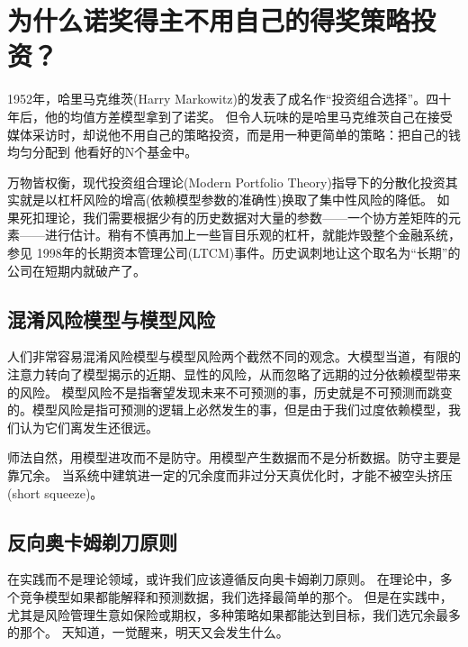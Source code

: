 \documentclass[
  oneside]{book}
\begin{document}
\hypertarget{ux4e3aux4ec0ux4e48ux8bfaux5956ux5f97ux4e3bux4e0dux7528ux81eaux5df1ux7684ux5f97ux5956ux7b56ux7565ux6295ux8d44}{%
\chapter{为什么诺奖得主不用自己的得奖策略投资？}\label{ux4e3aux4ec0ux4e48ux8bfaux5956ux5f97ux4e3bux4e0dux7528ux81eaux5df1ux7684ux5f97ux5956ux7b56ux7565ux6295ux8d44}}

1952年，哈里马克维茨(Harry Markowitz)的发表了成名作``投资组合选择''。四十年后，他的均值方差模型拿到了诺奖。
但令人玩味的是哈里马克维茨自己在接受媒体采访时，却说他不用自己的策略投资，而是用一种更简单的策略：把自己的钱均匀分配到
他看好的N个基金中。

万物皆权衡，现代投资组合理论(Modern Portfolio Theory)指导下的分散化投资其实就是以杠杆风险的增高(依赖模型参数的准确性)换取了集中性风险的降低。
如果死扣理论，我们需要根据少有的历史数据对大量的参数------一个协方差矩阵的元素------进行估计。稍有不慎再加上一些盲目乐观的杠杆，就能炸毁整个金融系统，参见
1998年的长期资本管理公司(LTCM)事件。历史讽刺地让这个取名为``长期''的公司在短期内就破产了。

\hypertarget{ux6df7ux6dc6ux98ceux9669ux6a21ux578bux4e0eux6a21ux578bux98ceux9669}{%
\section{混淆风险模型与模型风险}\label{ux6df7ux6dc6ux98ceux9669ux6a21ux578bux4e0eux6a21ux578bux98ceux9669}}

人们非常容易混淆风险模型与模型风险两个截然不同的观念。大模型当道，有限的注意力转向了模型揭示的近期、显性的风险，从而忽略了远期的过分依赖模型带来的风险。
模型风险不是指奢望发现未来不可预测的事，历史就是不可预测而跳变的。模型风险是指可预测的逻辑上必然发生的事，但是由于我们过度依赖模型，我们认为它们离发生还很远。

师法自然，用模型进攻而不是防守。用模型产生数据而不是分析数据。防守主要是靠冗余。
当系统中建筑进一定的冗余度而非过分天真优化时，才能不被空头挤压(short squeeze)。

\hypertarget{ux53cdux5411ux5965ux5361ux59c6ux5243ux5200ux539fux5219}{%
\section{反向奥卡姆剃刀原则}\label{ux53cdux5411ux5965ux5361ux59c6ux5243ux5200ux539fux5219}}

在实践而不是理论领域，或许我们应该遵循反向奥卡姆剃刀原则。
在理论中，多个竞争模型如果都能解释和预测数据，我们选择最简单的那个。
但是在实践中，尤其是风险管理生意如保险或期权，多种策略如果都能达到目标，我们选冗余最多的那个。
天知道，一觉醒来，明天又会发生什么。
\end{document}
